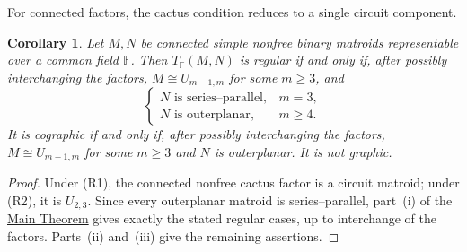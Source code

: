 \documentclass[12pt,a4paper]{article}
\numberwithin{equation}{section}
\newcommand{\F}{\mathbb F}
\newcommand{\mainthm}{\hyperref[thm:regular-two-factor]{Main Theorem}}
\newtheorem{corollary}[corollary]{Corollary}
\theoremstyle{definition}
\theoremstyle{remark}
\begin{document}
For connected factors, the cactus condition reduces to a single
circuit component.
\begin{corollary}\label{cor:regular-connected}
Let \(M,N\) be connected simple nonfree binary matroids representable
over a common field \(\F\).
Then \(T_{\F}(M,N)\) is regular if and only if, after possibly interchanging
the factors, \(M\cong U_{m-1,m}\) for some \(m\ge3\), and
\[
 \begin{cases}
 N\text{ is series--parallel},&m=3,\\
 N\text{ is outerplanar},&m\ge4.
 \end{cases}
\]
It is cographic if and only if, after possibly interchanging the factors,
\(M\cong U_{m-1,m}\) for some \(m\ge3\) and \(N\) is outerplanar.
It is not graphic.
\end{corollary}
\begin{proof}
Under \textup{(R1)}, the connected nonfree cactus factor is a
circuit matroid; under \textup{(R2)}, it is \(U_{2,3}\).
Since every outerplanar matroid is series--parallel, part~(i) of
the \mainthm{} gives exactly the stated regular cases, up to
interchange of the factors.  Parts~(ii) and~(iii) give the
remaining assertions.
\end{proof}
\end{document}
